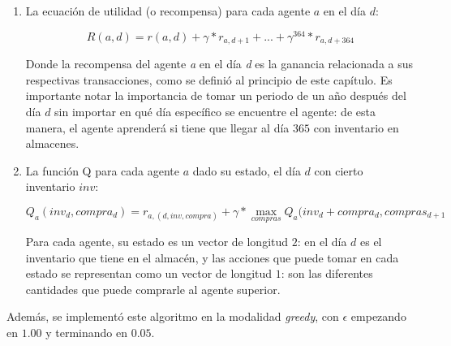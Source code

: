 \begin{enumerate}
    \item La ecuaci\'on de utilidad (o recompensa) para cada agente $a$ en el d\'ia $d$:

$$
R(a, d) = r(a,d) + \gamma*r_{a, d+1} + ... + \gamma^{364}*r_{a,d+364}
$$

Donde la recompensa del agente \textit{a} en el d\'ia \textit{d} es la ganancia relacionada a sus respectivas transacciones, como se defini\'o al principio de este cap\'itulo. Es importante notar la importancia de tomar un periodo de un a\~no despu\'es del d\'ia $d$ sin importar en qu\'e d\'ia espec\'ifico se encuentre el agente: de esta manera, el agente aprender\'a si tiene que llegar al d\'ia $365$ con inventario en almacenes.

    \item La funci\'on Q para cada agente $a$ dado su estado, el d\'ia $d$ con cierto inventario $inv$:

$$
Q_{a}(inv_{d},compra_{d}) = r_{a, (d, inv, compra)} + \gamma * \max_{compras}{Q_{a}(inv_{d} + compra_{d}, compras_{d+1}}
$$

Para cada agente, su estado es un vector de longitud $2$: en el d\'ia $d$ es el inventario que tiene en el almac\'en, y las acciones que puede tomar en cada estado se representan como un vector de longitud $1$: son las diferentes cantidades que puede comprarle al agente superior.
\end{enumerate}

Adem\'as, se implement\'o este algoritmo en la modalidad \textit{greedy}, con $\epsilon$ empezando en $1.00$ y terminando en $0.05$.

